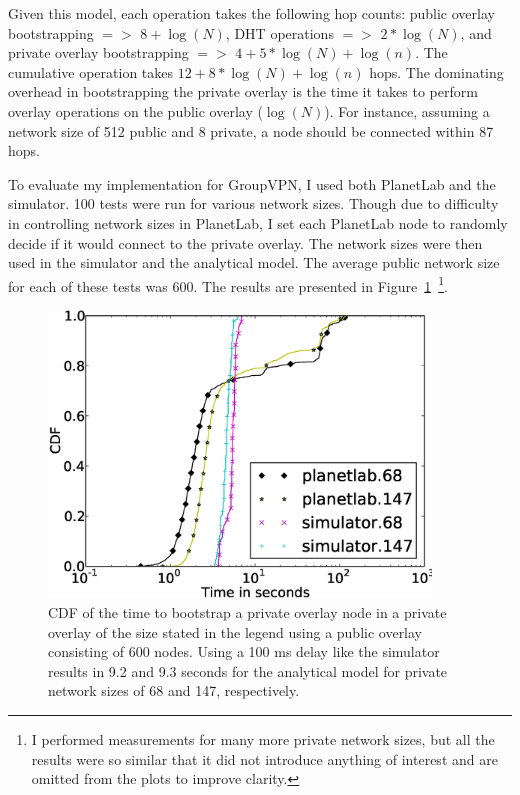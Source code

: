 Given this model, each operation takes the following hop counts: public overlay
bootstrapping $=>$ $8 + \log(N)$, DHT operations $=>$ $2 * \log(N)$, and
private overlay bootstrapping $=>$ $4 + 5 * \log(N) + \log(n)$.  The cumulative
operation takes $12 + 8 * \log(N) + \log(n)$ hops.  The dominating overhead in
bootstrapping the private overlay is the time it takes to perform overlay
operations on the public overlay ($\log(N)$).  For instance, assuming a network
size of 512 public and 8 private, a node should be connected within 87 hops.

To evaluate my implementation for GroupVPN, I used both PlanetLab and the
simulator.  100 tests were run for various network sizes.  Though due to
difficulty in controlling network sizes in PlanetLab, I set each PlanetLab node
to randomly decide if it would connect to the private overlay.  The network
sizes were then used in the simulator and the analytical model.  The average
public network size for each of these tests was 600.  The results are presented
in Figure~\ref{fig:private_bootstrapping}~\footnote{I performed measurements
for many more private network sizes, but all the results were so similar that
it did not introduce anything of interest and are omitted from the  plots to
improve clarity.}.

\begin{figure}[ht]
\centering
\includegraphics[width=4in]{figs/private.eps}
\caption[CDF of private overlay bootstrap time]{CDF of the time to bootstrap a
private overlay node in a private overlay of the size stated in the legend
using a public overlay consisting of 600 nodes.  Using a 100 ms delay like the
simulator results in 9.2 and 9.3 seconds for the analytical model for private
network sizes of 68 and 147, respectively.}
\label{fig:private_bootstrapping}
\end{figure}

